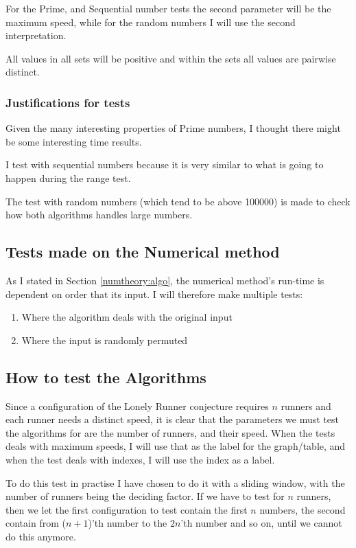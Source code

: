 For the Prime, and Sequential number tests the second parameter will be the maximum speed, while for the random numbers I will use the second interpretation.

All values in all sets will be positive and within the sets all values are pairwise distinct.

\subsubsection{Justifications for tests}

Given the many interesting properties of Prime numbers, I thought there might be some interesting time results. 

I test with sequential numbers because it is very similar to what is going to happen during the range test. 

The test with random numbers (which tend to be above 100000) is made to check how both algorithms handles large numbers.

\subsection{Tests made on the Numerical method}
As I stated in Section \ref{numtheory:algo}, the numerical
method's run-time is dependent on order that its input. I will
therefore make multiple tests:
\begin{enumerate}
\item Where the algorithm deals with the original input
\item Where the input is randomly permuted
\end{enumerate} 

\subsection{How to test the Algorithms}
Since a configuration of the Lonely Runner conjecture requires $n$ runners and each runner needs a distinct speed, it is clear that the parameters we must test the algorithms for are the number of runners, and their speed. When the tests deals with maximum speeds, I will use that as the label for the graph/table, and when the test deals with indexes, I will use the index as a label.

To do this test in practise I have chosen to do it with a sliding window, with the number of runners being the deciding factor. If we have to test for $n$ runners, then we let the first configuration to test contain the first $n$ numbers, the second contain from ($n+1$)'th number to the $2n$'th number and so on, until we cannot do this anymore.

